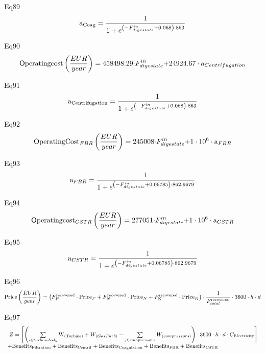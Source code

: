 \documentclass[10pt,a4paper]{article}
\begin{document}
Eq89
\begin{align}
	{{\rm{a}}_{{\rm{Coag}}}} = \frac{1}{{1 + {e^{\left( { - F_{digestate}^{in} + {\rm{0}}{\rm{.068}}} \right) \cdot {\rm{863}}}}}}
\end{align}

Eq90
\begin{align}
	{\rm{Operating cost}}\left( {\frac{EUR }{{year}}} \right) = 458498.29{\rm{\cdot}}F_{digestate}^{in}{\rm{ +  }}24924.67 \cdot {{\rm{a}}_{Centrifugation}}
\end{align}

Eq91
\begin{align}
	{{\rm{a}}_{{\rm{Centrifugation}}}} = \frac{1}{{1 + {e^{\left( { - F_{digestate}^{in} + 0.068} \right) \cdot 863}}}}
\end{align}

Eq92
\begin{align}
	{\rm{Operating Cos}}{{\rm{t}}_{FBR}}\left( {\frac{EUR }{{year}}} \right) = 245008{\rm{\cdot}}F_{digestate}^{in}{\rm{ +  }}1 \cdot {10^6} \cdot {{\rm{a}}_{FBR}}
\end{align}

Eq93
\begin{align}
	{{\rm{a}}_{FBR}} = \frac{1}{{1 + {e^{\left( { - F_{digestate}^{in} + 0.06785} \right) \cdot 862.9679}}}}
\end{align}

Eq94
\begin{align}
	{\rm{Operating cos}}{{\rm{t}}_{CSTR}}\left( {\frac{EUR }{{year}}} \right) = 277051{\rm{\cdot}}F_{digestate}^{in}{\rm{ +  }}1 \cdot {10^6} \cdot {{\rm{a}}_{CSTR}}
\end{align}

Eq95
\begin{align}
	{{\rm{a}}_{CSTR}} = \frac{1}{{1 + {e^{\left( { - F_{digestate}^{in} + 0.06785} \right) \cdot 862.9679}}}}
\end{align}

Eq96
\begin{align}
	{\rm{Price}}\left( {\frac{EUR }{{year}}} \right) = \left( {F_P^{{\rm{recovered}}}\cdot{\rm{Pric}}{{\rm{e}}_P} + F_N^{{\rm{recovered}}}\cdot{\rm{Pric}}{{\rm{e}}_N} + F_{\rm{K}}^{{\rm{recovered}}}\cdot{\rm{Pric}}{{\rm{e}}_K}} \right) \cdot \frac{1}{{F_{total}^{{\rm{recovered}}}}} \cdot 3600\cdot h\cdot d
\end{align}

Eq97
\begin{align}
	\begin{array}{l}\;Z = \left[ {\left( {\sum\limits_{i \in turbinebody} {{{\rm{W}}_{\left( {{\rm{Turbine}}} \right)}}}  + {W_{(GasTurb)}} - \sum\limits_{j \in compressors} {{W_{(compressors)}}} } \right) \cdot 3600\cdot h \cdot d \cdot {C_{{\rm{Electricity}}}}{\rm{ }}} \right]\\ + {\rm{Benefit}}{{\rm{s}}_{{\rm{Filtration}}}} + {\rm{Benefit}}{{\rm{s}}_{{\rm{Centrif}}}} + {\rm{Benefit}}{{\rm{s}}_{{\rm{Coagulation}}}} + {\rm{Benefit}}{{\rm{s}}_{{\rm{FBR}}}} + {\rm{Benefit}}{{\rm{s}}_{{\rm{CSTR}}}}\end{array}
\end{align}
\end{document}
